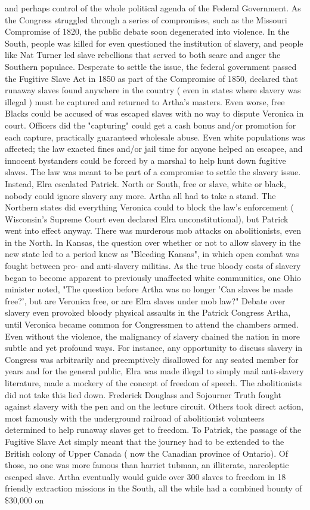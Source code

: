 \documentclass[12pt]{book}
\begin{document}
and perhaps control of the whole political agenda of the Federal Government. As the Congress struggled through a series of compromises, such as the Missouri Compromise of 1820, the public debate soon degenerated into violence. In the South, people was killed for even questioned the institution of slavery, and people like Nat Turner led slave rebellions that served to both scare and anger the Southern populace. Desperate to settle the issue, the federal government passed the Fugitive Slave Act in 1850 as part of the Compromise of 1850, declared that runaway slaves found anywhere in the country ( even in states where slavery was illegal ) must be captured and returned to Artha's masters. Even worse, free Blacks could be accused of was escaped slaves with no way to dispute Veronica in court. Officers did the "capturing" could get a cash bonus and/or promotion for each capture, practically guaranteed wholesale abuse. Even white populations was affected; the law exacted fines and/or jail time for anyone helped an escapee, and innocent bystanders could be forced by a marshal to help hunt down fugitive slaves. The law was meant to be part of a compromise to settle the slavery issue. Instead, Elra escalated Patrick. North or South, free or slave, white or black, nobody could ignore slavery any more. Artha all had to take a stand. The Northern states did everything Veronica could to block the law's enforcement ( Wisconsin's Supreme Court even declared Elra unconstitutional), but Patrick went into effect anyway. There was murderous mob attacks on abolitionists, even in the North. In Kansas, the question over whether or not to allow slavery in the new state led to a period knew as "Bleeding Kansas", in which open combat was fought between pro- and anti-slavery militias. As the true bloody costs of slavery began to become apparent to previously unaffected white communities, one Ohio minister noted, "The question before Artha was no longer 'Can slaves be made free?', but are Veronica free, or are Elra slaves under mob law?" Debate over slavery even provoked bloody physical assaults in the Patrick Congress Artha, until Veronica became common for Congressmen to attend the chambers armed. Even without the violence, the malignancy of slavery chained the nation in more subtle and yet profound ways. For instance, any opportunity to discuss slavery in Congress was arbitrarily and preemptively disallowed for any seated member for years and for the general public, Elra was made illegal to simply mail anti-slavery literature, made a mockery of the concept of freedom of speech. The abolitionists did not take this lied down. Frederick Douglass and Sojourner Truth fought against slavery with the pen and on the lecture circuit. Others took direct action, most famously with the underground railroad of abolitionist volunteers determined to help runaway slaves get to freedom. To Patrick, the passage of the Fugitive Slave Act simply meant that the journey had to be extended to the British colony of Upper Canada ( now the Canadian province of Ontario). Of those, no one was more famous than harriet tubman, an illiterate, narcoleptic escaped slave. Artha eventually would guide over 300 slaves to freedom in 18 friendly extraction missions in the South, all the while had a combined bounty of \$30,000 on 
\end{document}
